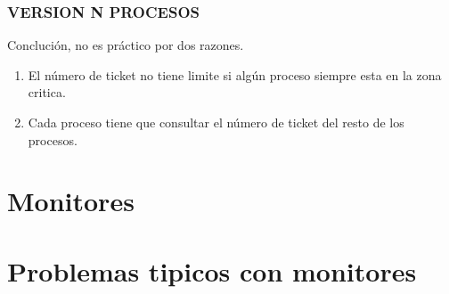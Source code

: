 \documentclass{article}
\begin{document}


\subsubsection{VERSION N PROCESOS}




Conclución, no es práctico por dos razones.
\begin{enumerate}
    \item El número de ticket no tiene limite si algún proceso siempre esta en la zona critica.
    \item Cada proceso tiene que consultar el número de ticket del resto de los procesos.
\end{enumerate}

\section{Monitores}

\section{Problemas tipicos con monitores}
\end{document}
